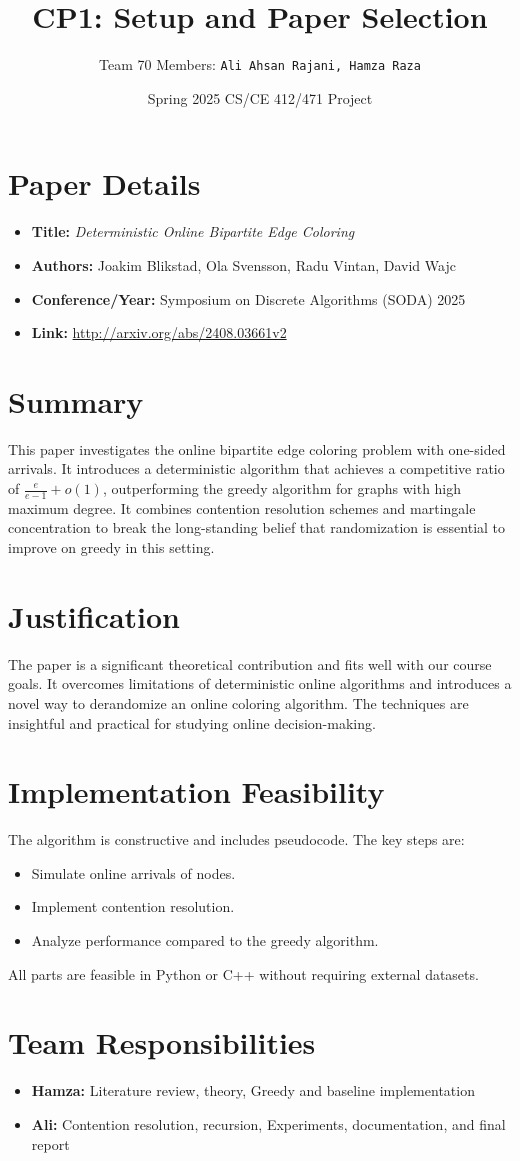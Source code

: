 \documentclass[11pt]{article}
\title{\textbf{CP1: Setup and Paper Selection}}
\date{Spring 2025 CS/CE 412/471 Project}
\author{Team 70 Members: \texttt{Ali Ahsan Rajani, Hamza Raza}}
\begin{document}
\maketitle

\section*{Paper Details}
\begin{itemize}[leftmargin=*]
    \item \textbf{Title:} \textit{Deterministic Online Bipartite Edge Coloring}
    \item \textbf{Authors:} Joakim Blikstad, Ola Svensson, Radu Vintan, David Wajc
    \item \textbf{Conference/Year:} Symposium on Discrete Algorithms (SODA) 2025
    \item \textbf{Link:} \url{http://arxiv.org/abs/2408.03661v2}
\end{itemize}

\section*{Summary}
This paper investigates the online bipartite edge coloring problem with one-sided arrivals. It introduces a deterministic algorithm that achieves a competitive ratio of \( \frac{e}{e - 1} + o(1) \), outperforming the greedy algorithm for graphs with high maximum degree. It combines contention resolution schemes and martingale concentration to break the long-standing belief that randomization is essential to improve on greedy in this setting.

\section*{Justification}
The paper is a significant theoretical contribution and fits well with our course goals. It overcomes limitations of deterministic online algorithms and introduces a novel way to derandomize an online coloring algorithm. The techniques are insightful and practical for studying online decision-making.

\section{Implementation Feasibility}
The algorithm is constructive and includes pseudocode. The key steps are:
\begin{itemize}
    \item Simulate online arrivals of nodes.
    \item Implement contention resolution.
    \item Analyze performance compared to the greedy algorithm.
\end{itemize}
All parts are feasible in Python or C++ without requiring external datasets.

\section*{Team Responsibilities}
\begin{itemize}
    \item \textbf{Hamza:} Literature review, theory, Greedy and baseline implementation
    \item \textbf{Ali:} Contention resolution, recursion, Experiments, documentation, and final report
\end{itemize}
\end{document}
